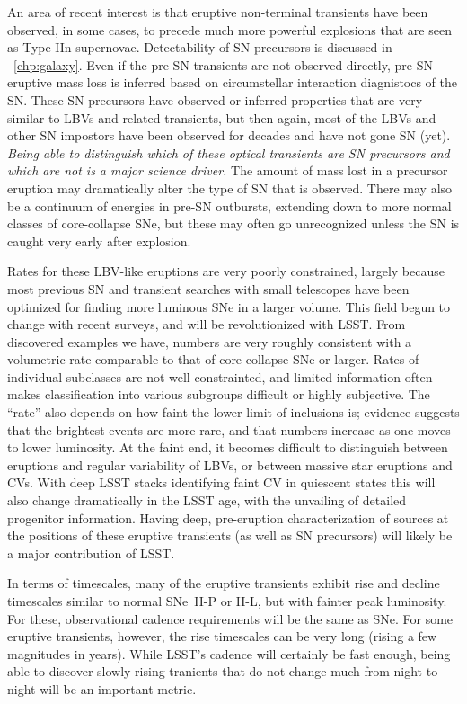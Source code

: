 An area of recent interest
is that eruptive non-terminal transients have been observed, in some
cases, to precede much more powerful explosions that are seen as Type
IIn supernovae.  Detectability of SN precursors is discussed in ~\autoref{chp:galaxy}. Even if the pre-SN transients are not observed
directly, pre-SN eruptive mass loss is inferred based on circumstellar
interaction diagnistocs of the SN.  These SN precursors have observed
or inferred properties that are very similar to LBVs and related
transients,
but then again,
most of the LBVs and other SN impostors have been observed for decades
and have not gone SN (yet).  \emph{Being able to distinguish which of these
optical transients are SN precursors and which are not is a major
science driver.}  The amount of mass lost in a precursor eruption may
dramatically alter the type of SN that is observed.  There may also be
a continuum of energies in pre-SN outbursts, extending down to more
normal classes of core-collapse SNe, but these may often go
unrecognized unless the SN is caught very early after explosion.

Rates for these LBV-like eruptions are very poorly constrained,
largely because most previous SN and transient searches with small
telescopes have been optimized for finding more luminous SNe in a
larger volume.  This field begun to change with recent surveys, and will
be revolutionized with LSST.  From discovered examples we have,
numbers are very roughly consistent with a volumetric rate comparable
to that of core-collapse SNe or larger.  %
Rates of individual subclasses are not well constrainted, and limited
information often makes classification into various subgroups
difficult or highly subjective.  The ``rate'' also depends on how
faint the lower limit of inclusions is; evidence suggests that the
brightest events are more rare, and that numbers increase as one moves
to lower luminosity.  At the faint end, it becomes difficult to
distinguish between eruptions and regular variability of LBVs, or
between massive star eruptions and CVs. With deep LSST stacks identifying faint CV in quiescent states this will also change dramatically in the LSST age, with the unvailing of detailed progenitor
information.  Having deep, pre-eruption characterization
of sources at the positions of these eruptive transients (as well as
SN precursors) will likely be a major contribution of LSST.

In terms of timescales, many of the eruptive transients exhibit rise
and decline timescales similar to normal SNe~II-P or II-L, but with
fainter peak luminosity.  For these, observational cadence
requirements will be the same as SNe.  For some eruptive transients,
however, the rise timescales can be very long (rising a few magnitudes
in years).  While LSST's cadence will certainly be fast enough, being
able to discover slowly rising tranients that do not change much from
night to night will be an important metric.

